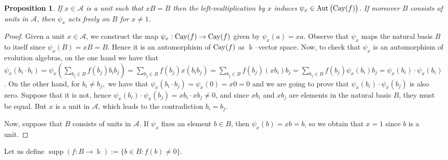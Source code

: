 \documentclass[a4paper,12pt]{amsart}
\newtheorem{proposition}[theorem]{Proposition}
\theoremstyle{definition}
\theoremstyle{remark}
\newcommand{\Aut}{\operatorname{Aut}}
\newcommand{\Cay}{{\rm Cay}}
\newcommand{\supp}{\operatorname{supp}}
\newcommand{\A}{\mathcal{A}}
\newcommand{\E}{{\mathcal E}}
\begin{document}
\begin{proposition}\label{prop:units_vs_aut}
If $x\in\A$ is a unit such that $xB=B$ then the left-multiplication by $x$ induces $\psi_x\in\Aut\big(\Cay(f)\big)$. If moreover $B$ consists of units in $\A$, then  $\psi_x$ acts freely on $B$ for $x \neq 1$.
\end{proposition}
\begin{proof}
	Given a unit $x\in\A$, we construct the map $\psi_x:\Cay(f)\rightarrow \Cay(f)$ given by $\psi_x(a)=xa$. Observe that $\psi_x$ maps the natural basis $B$ to itself since $\psi_x(B)=xB=B$. Hence it is an automorphism of $\Cay(f)$  as $\Bbbk$--vector space.  Now, 	to check that $\psi_x$ is an automorphism of evolution algebras, on the one hand we have that
$\psi_x(b_i\cdot b_i)=\psi_x(\sum_{b_j\in B}f(b_j)b_ib_j)=\sum_{b_j\in B}f(b_j)x(b_ib_j)=\sum_{b_j\in B}f(b_j)(x b_i)b_j= \sum_{b_j\in B}f(b_j)\psi_x(b_i)b_j=\psi_x(b_i)\cdot \psi_x(b_i)$. On the other hand, for $b_i \neq b_j,$  we have that $\psi_x(b_i\cdot b_j)=\psi_x(0)=x0=0 $ and we are going to prove that $\psi_x(b_i)\cdot \psi_x(b_j)$ is also zero. Suppose that it is not, hence $ \psi_x(b_i)\cdot \psi_x(b_j)=xb_i\cdot xb_j \neq 0$, and since $xb_i$ and  $xb_j $ are elements in the natural basis $B$,  they must be equal. But $x$ is a unit in $\A$, which leads to the contradiction $b_i = b_j$.
	
	
Now, suppose that $B$ consists of units in $\A$. If $\psi_x$ fixes an element $b \in B$,  then $\psi_x(b)=xb= b$,   so we obtain that $x=1$ since $b$ is a unit.
\end{proof}

Let us define $\supp(f: B \to \Bbbk):=\{b\in B\colon f(b)\ne 0\}$.
\end{document}
